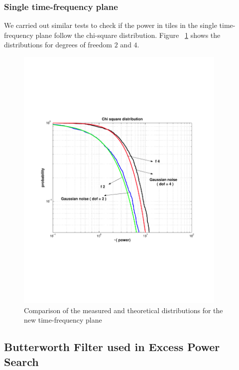 \subsubsection{Single time-frequency plane}
We carried out similar tests to check if the power in tiles in the 
single time-frequency plane follow the chi-square distribution.
Figure ~\ref{fig:compchisquarenew}  shows the distributions for
degrees of freedom $2$ and $4$. 
\begin{figure}[h]
\begin{center}
\includegraphics[width=0.9\textwidth]{figures/compchisquarenew2_4}
\caption{Comparison of the measured and theoretical distributions for the
  new time-frequency plane}
\label{fig:compchisquarenew}
\end{center}
\end{figure}     


\clearpage

\subsection{Butterworth Filter used in Excess Power Search}
\label{section:Butterworth}

